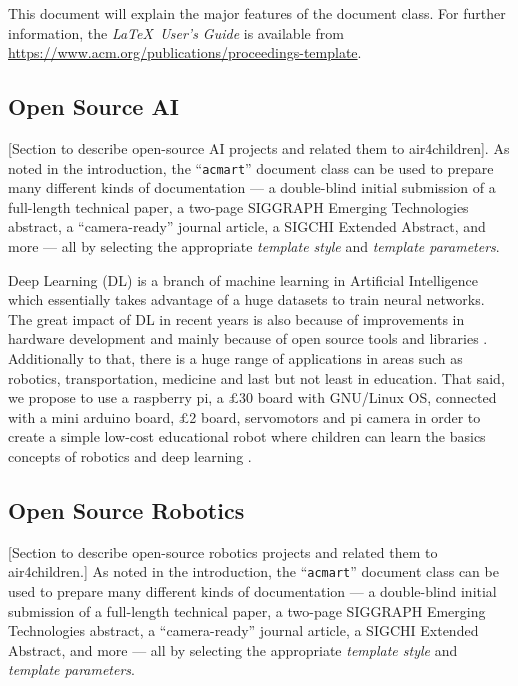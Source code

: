 \documentclass[sigconf]{acmart}
\begin{document}
This document will explain the major features of the document
class. For further information, the {\itshape \LaTeX\ User's Guide} is
available from
\url{https://www.acm.org/publications/proceedings-template}.


\subsection{Open Source AI}
[Section to describe open-source AI projects and related them to air4children].
As noted in the introduction, the ``\verb|acmart|'' document class can
be used to prepare many different kinds of documentation --- a
double-blind initial submission of a full-length technical paper, a
two-page SIGGRAPH Emerging Technologies abstract, a ``camera-ready''
journal article, a SIGCHI Extended Abstract, and more --- all by
selecting the appropriate {\itshape template style} and {\itshape
  template parameters}.

  Deep Learning (DL) is a branch of machine learning in Artificial Intelligence
  which essentially takes advantage of a huge datasets to train neural networks.
  The great impact of DL in recent years is also because of improvements in 
  hardware development and mainly because of open source tools and libraries \cite{matelabs2017}.
  Additionally to that, there is a huge range of applications in areas such as robotics,
  transportation, medicine and last but not least in education.
  That said, we propose to use a raspberry pi, a $\pounds$30 board with
  GNU/Linux OS, connected with a mini arduino board, $\pounds$2 board,  servomotors 
  and pi camera in order to create a simple low-cost educational robot 
  where children can learn the basics concepts of robotics and deep learning \cite{durr2015}.
  

\subsection{Open Source Robotics}
[Section to describe open-source robotics projects and related them to air4children.]
As noted in the introduction, the ``\verb|acmart|'' document class can
be used to prepare many different kinds of documentation --- a
double-blind initial submission of a full-length technical paper, a
two-page SIGGRAPH Emerging Technologies abstract, a ``camera-ready''
journal article, a SIGCHI Extended Abstract, and more --- all by
selecting the appropriate {\itshape template style} and {\itshape
  template parameters}.
\end{document}
